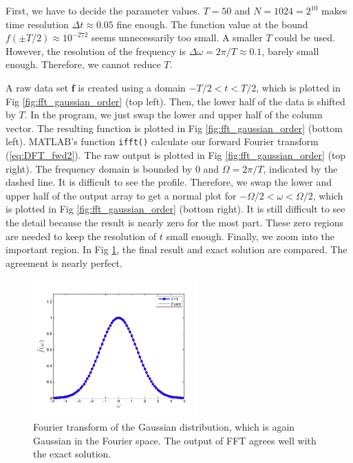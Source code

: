 \begin{example}
First, we have to decide the parameter values. $T=50$ and $N=1024=2^{10}$ makes time resolution $\Delta t \approx 0.05$ fine enough. The function value at the bound $f(\pm T/2) \approx 10^{-272}$ seems unnecessarily too small.  A smaller $T$ could be used.  However, the resolution of the frequency is $\Delta \omega = 2\pi/T \approx 0.1$, barely small enough.  Therefore, we cannot reduce $T$.

A raw data set $\mathbf{f}$ is created using a domain $-T/2 < t < T/2$, which is plotted in Fig \ref{fig:fft_gaussian_order} (top left).  Then, the lower half of the data is shifted by $T$.  In the program, we just swap the lower and upper half of the column vector.   The resulting function is plotted in Fig \ref{fig:fft_gaussian_order} (bottom left).  MATLAB's function \texttt{ifft()} calculate our forward Fourier transform (\ref{eq:DFT_fwd2}).  The raw output is plotted in Fig \ref{fig:fft_gaussian_order} (top right). The frequency domain is bounded by $0$ and $\Omega=2 \pi/T$, indicated by the dashed line.  It is difficult to see the profile. Therefore, we swap the lower and upper half of the output array to get a normal plot for $-\Omega/2 < \omega < \Omega/2$, which is plotted in Fig \ref{fig:fft_gaussian_order} (bottom right).
It is still difficult to see the detail because the result is nearly zero for the most part.  These zero regions are needed to keep the resolution of $t$ small enough.  Finally, we zoom into the important region.  In Fig \ref{fig:fft_gaussian}, the final result and exact solution are compared.  The agreement is nearly perfect.  

\begin{figure}
\centering
\includegraphics[width=2.5in]{11.fft/fft_gaussian.pdf}
\caption{Fourier transform of the Gaussian distribution, which is again Gaussian in the Fourier space. The output of FFT agrees well with the exact solution.}\label{fig:fft_gaussian}
\end{figure}
\end{example}


